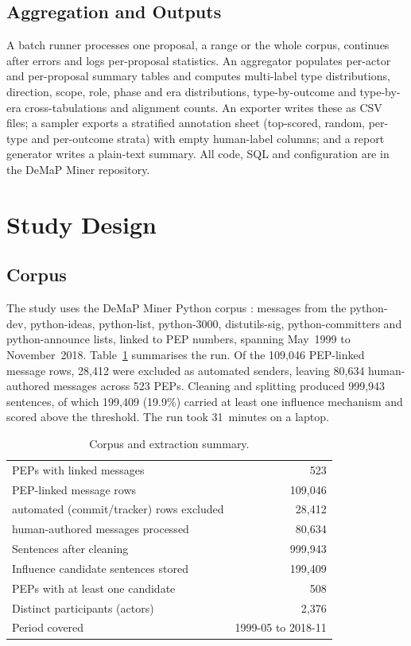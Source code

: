 \documentclass[sigconf,screen]{acmart}
\begin{document}
\subsection{Aggregation and Outputs}

A batch runner processes one proposal, a range or the whole corpus, continues after errors and logs per-proposal statistics. An aggregator populates per-actor and per-proposal summary tables and computes multi-label type distributions, direction, scope, role, phase and era distributions, type-by-outcome and type-by-era cross-tabulations and alignment counts. An exporter writes these as CSV files; a sampler exports a stratified annotation sheet (top-scored, random, per-type and per-outcome strata) with empty human-label columns; and a report generator writes a plain-text summary. All code, SQL and configuration are in the DeMaP Miner repository.

\section{Study Design}

\subsection{Corpus}

The study uses the DeMaP Miner Python corpus \cite{sharma2022demap,sharma2024rationale}: messages from the python-dev, python-ideas, python-list, python-3000, distutils-sig, python-committers and python-announce lists, linked to PEP numbers, spanning May~1999 to November~2018. Table~\ref{tab:corpus} summarises the run. Of the 109,046 PEP-linked message rows, 28,412 were excluded as automated senders, leaving 80,634 human-authored messages across 523 PEPs. Cleaning and splitting produced 999,943 sentences, of which 199,409 (19.9\%) carried at least one influence mechanism and scored above the threshold. The run took 31~minutes on a laptop.

\begin{table}[t]
\caption{Corpus and extraction summary.}
\label{tab:corpus}
\begin{tabular}{lr}
\toprule
PEPs with linked messages & 523 \\
PEP-linked message rows & 109,046 \\
\quad automated (commit/tracker) rows excluded & 28,412 \\
\quad human-authored messages processed & 80,634 \\
Sentences after cleaning & 999,943 \\
Influence candidate sentences stored & 199,409 \\
PEPs with at least one candidate & 508 \\
Distinct participants (actors) & 2,376 \\
Period covered & 1999-05 to 2018-11 \\
\bottomrule
\end{tabular}
\end{table}
\end{document}
